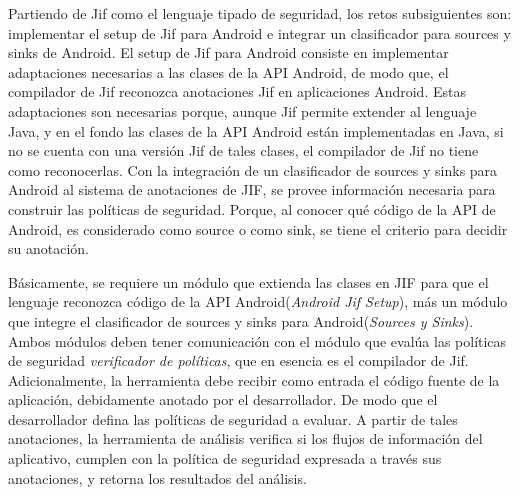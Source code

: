 Partiendo de Jif como el lenguaje tipado de seguridad, los retos subsiguientes
son: implementar el setup de Jif para Android e integrar un clasificador
para sources y sinks de Android.\newline 
El setup de Jif para Android consiste en implementar adaptaciones necesarias
a las clases de la API Android, de modo que, el compilador de Jif reconozca
anotaciones Jif en aplicaciones Android. Estas adaptaciones son necesarias
porque, aunque Jif permite extender al lenguaje Java, y en el fondo las clases
de la API Android están implementadas en Java, si no se cuenta con una versión
Jif de tales clases, el compilador de Jif no tiene como reconocerlas.\newline
Con la integración de un clasificador de sources y sinks para Android al sistema
de anotaciones de JIF, se provee información necesaria para construir las
políticas de seguridad. Porque, al conocer qué código de la API de Android,
es considerado como source o como sink, se tiene el criterio para decidir su
anotación.

Básicamente, se requiere un módulo que extienda las clases en JIF para que el
lenguaje reconozca código de la API Android(\emph{Android Jif Setup}), más un
módulo que integre el clasificador de sources y sinks para Android(\emph{Sources
y Sinks}). 
Ambos módulos deben tener comunicación con el módulo que evalúa las
políticas de seguridad \emph{verificador de políticas}, que en esencia es el
compilador de Jif.\newline
Adicionalmente, la herramienta
debe recibir como entrada el código fuente de la aplicación, debidamente
anotado por el desarrollador. De modo que el desarrollador defina las políticas
de seguridad a evaluar. A partir de tales anotaciones, la herramienta de
análisis verifica si los flujos de información del aplicativo, cumplen con la
política de seguridad expresada a través sus anotaciones, y retorna los
resultados del análisis.

